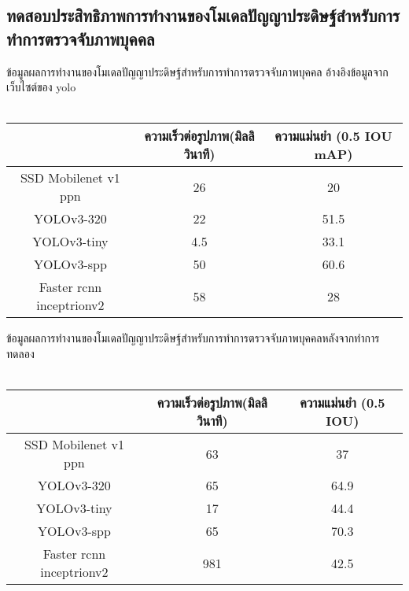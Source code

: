 
\subsection{ทดสอบประสิทธิภาพการทำงานของโมเดลปัญญาประดิษฐ์สำหรับการทำการตรวจจับภาพบุคคล}
 ข้อมูลผลการทำงานของโมเดลปัญญาประดิษฐ์สำหรับการทำการตรวจจับภาพบุคคล อ้างอิงข้อมูลจากเว็บไซต์ของ yolo			\\
\\
\begin{tabular}{|c|c|c|}
		\hline
		{}&{ความเร็วต่อรูปภาพ(มิลลิวินาที)}&{ความแม่นยำ (0.5 IOU mAP)}			\\
		\hline
		SSD Mobilenet v1 ppn	 		& 26				& 20														\\
		YOLOv3-320				& 22				& 51.5				\\	
		YOLOv3-tiny				& 4.5				& 33.1				\\
		YOLOv3-spp				& 50				& 60.6				\\	
		Faster rcnn inceptrionv2		& 58				& 28		\\
	\hline
\end{tabular}

ข้อมูลผลการทำงานของโมเดลปัญญาประดิษฐ์สำหรับการทำการตรวจจับภาพบุคคลหลังจากทำการทดลอง
\\\\
\begin{tabular}{|c|c|c|}
		\hline 
		{}&{ความเร็วต่อรูปภาพ(มิลลิวินาที)}&{ความแม่นยำ (0.5 IOU)}			\\
		\hline
		SSD Mobilenet v1 ppn	 					& 63 			& 37			\\
		YOLOv3-320							& 65			& 64.9		\\
		YOLOv3-tiny							& 17			& 44.4			\\
		YOLOv3-spp							& 65			& 70.3			\\	
		Faster rcnn inceptrionv2					& 981		& 42.5		\\
	\hline
\end{tabular}
